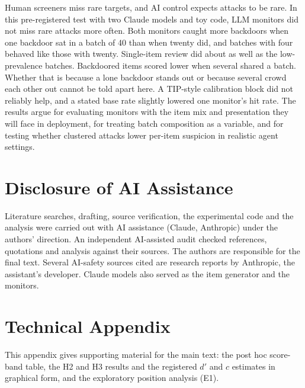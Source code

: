 \documentclass[letterpaper]{article} %
\begin{document}
Human screeners miss rare targets, and AI control expects attacks to be rare. In this pre-registered test with two Claude models and toy code, LLM monitors did not miss rare attacks more often. Both monitors caught more backdoors when one backdoor sat in a batch of 40 than when twenty did, and batches with four behaved like those with twenty. Single-item review did about as well as the low-prevalence batches. Backdoored items scored lower when several shared a batch. Whether that is because a lone backdoor stands out or because several crowd each other out cannot be told apart here. A TIP-style calibration block did not reliably help, and a stated base rate slightly lowered one monitor's hit rate. The results argue for evaluating monitors with the item mix and presentation they will face in deployment, for treating batch composition as a variable, and for testing whether clustered attacks lower per-item suspicion in realistic agent settings.

\section{Disclosure of AI Assistance}

Literature searches, drafting, source verification, the experimental code and the analysis were carried out with AI assistance (Claude, Anthropic) under the authors' direction. An independent AI-assisted audit checked references, quotations and analysis against their sources. The authors are responsible for the final text. Several AI-safety sources cited are research reports by Anthropic, the assistant's developer. Claude models also served as the item generator and the monitors.



\appendix
\section{Technical Appendix}

This appendix gives supporting material for the main text: the post hoc score-band table, the H2 and H3 results and the registered $d'$ and $c$ estimates in graphical form, and the exploratory position analysis (E1).
\end{document}
